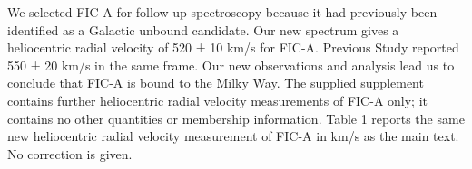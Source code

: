We selected FIC-A for follow-up spectroscopy because it had previously been identified as a Galactic unbound candidate.
Our new spectrum gives a heliocentric radial velocity of 520 ± 10 km/s for FIC-A. Previous Study reported 550 ± 20 km/s in the same frame.
Our new observations and analysis lead us to conclude that FIC-A is bound to the Milky Way.
The supplied supplement contains further heliocentric radial velocity measurements of FIC-A only; it contains no other quantities or membership information.
Table 1 reports the same new heliocentric radial velocity measurement of FIC-A in km/s as the main text. No correction is given.
